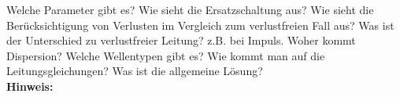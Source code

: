 \begin{question}[section=5,subsection=53,name={Standardmodell für Verlustbehaftete Doppelleiter},difficulty=8,type=mdl,mode=exm,tags={}]
	Welche Parameter gibt es? Wie sieht die Ersatzschaltung aus? Wie sieht die Berücksichtigung von Verlusten im Vergleich zum verlustfreien Fall aus? Was ist der Unterschied zu verlustfreier Leitung? z.B. bei Impuls. Woher kommt Dispersion? Welche Wellentypen gibt es? Wie kommt man auf die Leitungsgleichungen? Was ist die allgemeine Lösung?
	\\ \textbf{Hinweis:}\\
	
\end{question}
\begin{solution}
	
\end{solution}